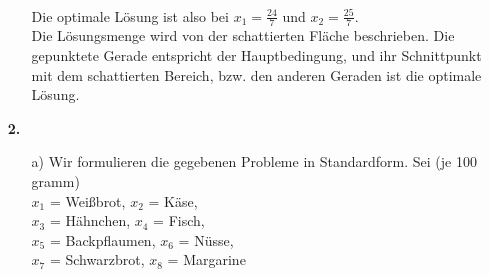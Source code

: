 \documentclass [a4paper,11pt]{article}
\begin{document}
\begin{enumerate}
\begin{enumerate}
                    \\
                    Die optimale Lösung ist also bei $x_1 = \frac{24}{7}$ und $x_2 = \frac{25}{7}$. \\
                    Die Lösungsmenge wird von der schattierten Fläche beschrieben. Die gepunktete Gerade entspricht
                    der Hauptbedingung, und ihr Schnittpunkt mit dem schattierten Bereich, bzw. den anderen Geraden
                    ist die optimale Lösung.

            \end{enumerate}
        \item[\textbf{2.}]
        \begin{enumerate}
                \item[a)]
                    Wir formulieren die gegebenen Probleme in Standardform. Sei (je 100 gramm)\\
                    $x_1$ = Weißbrot, $x_2$ = Käse,\\
                    $x_3$ = Hähnchen, $x_4$ = Fisch,\\
                    $x_5$ = Backpflaumen, $x_6$ = Nüsse,\\
                    $x_7$ = Schwarzbrot, $x_8$ = Margarine\\


\end{enumerate}
\end{enumerate}
\end{document}
